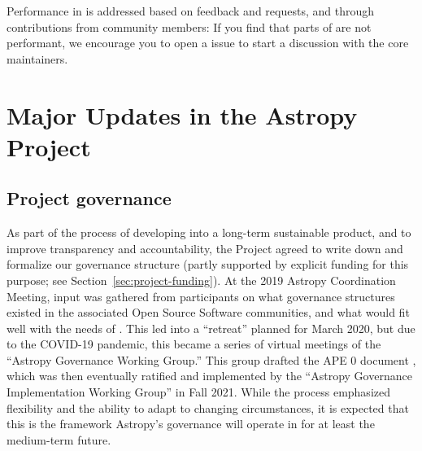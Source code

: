 \documentclass[modern]{aastex631}
\newcommand{\secauthor}[1]{{\color{blue}Author:~\textit{#1}}}
\begin{document}
Performance in \astropypkg is addressed based on feedback and requests, and
through contributions from community members: If you find that parts of
\astropypkg are not performant, we encourage you to open a \github issue to
start a discussion with the \astropypkg core maintainers.


\section{Major Updates in the Astropy Project} \label{sec:project-updates}

\subsection{Project governance} \label{sec:project-governance}



As part of the process of developing \astropypkg into a long-term sustainable
product, and to improve transparency and accountability, the Project agreed to
write down and formalize our governance structure (partly supported by explicit
funding for this purpose; see Section~\ref{sec:project-funding}). At the 2019
Astropy Coordination Meeting, input was gathered from participants on what governance
structures existed in the associated Open Source Software communities, and what
would fit well with the needs of \astropy. This led into a ``retreat'' planned
for March 2020, but due to the COVID-19 pandemic, this became a series of
virtual meetings of the ``Astropy Governance Working Group.'' This group
drafted the APE 0 document \citep{ape0}, which was then eventually ratified and
implemented by the ``Astropy Governance Implementation Working Group'' in Fall
2021. While the process emphasized flexibility and the ability to adapt to
changing circumstances, it is expected that this is the framework Astropy's
governance will operate in for at least the medium-term future.
\end{document}
